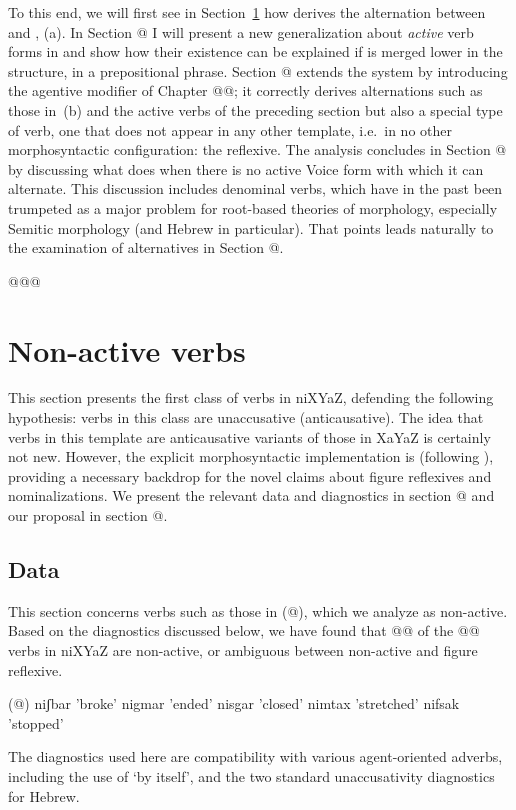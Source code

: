 To this end, we will first see in Section~\ref{vz:nact} how {\vz} derives the alternation between {\tkal} and {\tnif}, (\lastx a). In Section @ I will present a new generalization about \emph{active} verb forms in {\tnif} and show how their existence can be explained if {\vz} is merged lower in the structure, in a prepositional phrase. Section @ extends the system by introducing the agentive modifier {\vz} of Chapter @@; it correctly derives alternations such as those in~(\lastx b) and the active verbs of the preceding section but also a special type of verb, one that does not appear in any other template, i.e.~in no other morphosyntactic configuration: the reflexive. The analysis concludes in Section @ by discussing what {\vz} does when there is no active Voice form with which it can alternate. This discussion includes denominal verbs, which have in the past been trumpeted as a major problem for root-based theories of morphology, especially Semitic morphology (and Hebrew in particular). That points leads naturally to the examination of alternatives in Section @.

@@@
\section{Non-active verbs} \label{vz:nact}
This section presents the first class of verbs in niXYaZ, defending the following hypothesis: verbs in this class are unaccusative (anticausative). The idea that verbs in this template are anticausative variants of those in XaYaZ is certainly not new. However, the explicit morphosyntactic implementation is (following \cite{kastner17gjgl}), providing a necessary backdrop for the novel claims about figure reflexives and nominalizations. We present the relevant data and diagnostics in section @ and our proposal in section @.

	\subsection{Data}
This section concerns verbs such as those in (@), which we analyze as non-active. Based on the diagnostics discussed below, we have found that @@ of the @@ verbs in niXYaZ are non-active, or ambiguous between non-active and figure reflexive.

(@) niʃbar   'broke'
    nigmar   'ended'
    nisgar   'closed'
    nimtax   'stretched'
    nifsak  'stopped'

The diagnostics used here are compatibility with various agent-oriented adverbs, including the use of ‘by itself’, and the two standard unaccusativity diagnostics for Hebrew.

